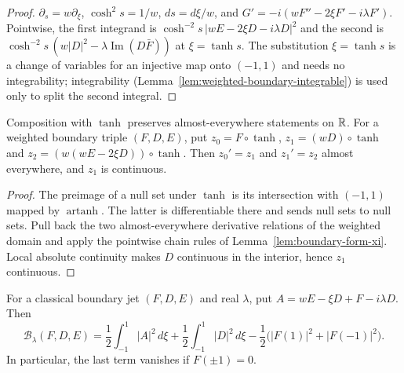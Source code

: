 \begin{proof}
\leanok
$\partial_s=w\partial_\xi$, $\cosh^2s=1/w$, $ds=d\xi/w$, and
$G'=-i(wF''-2\xi F'-i\lambda F')$. Pointwise, the first integrand is
$\cosh^{-2}s\,|wE-2\xi D-i\lambda D|^2$ and the second is
$\cosh^{-2}s\,(w|D|^2-\lambda\operatorname{Im}(D\bar F))$ at $\xi=\tanh s$. The
substitution $\xi=\tanh s$ is a change of variables for an injective map
onto $(-1,1)$ and needs no integrability; integrability
(Lemma~\ref{lem:weighted-boundary-integrable}) is used only to split the
second integral.
\end{proof}

\begin{lemma}
\label{lem:weighted-flow-derivatives}
\leanok
Composition with $\tanh$ preserves almost-everywhere statements on $\mathbb{R}$.
For a weighted boundary triple $(F,D,E)$, put
$z_0=F\circ\tanh$, $z_1=(wD)\circ\tanh$ and
$z_2=(w(wE-2\xi D))\circ\tanh$. Then $z_0'=z_1$ and $z_1'=z_2$ almost everywhere,
and $z_1$ is continuous.
\end{lemma}

\begin{proof}
\leanok
The preimage of a null set under $\tanh$ is its intersection with $(-1,1)$ mapped by
$\operatorname{artanh}$. The latter is differentiable there and sends null sets to null
sets. Pull back the two almost-everywhere derivative relations of the weighted domain
and apply the pointwise chain rules of Lemma~\ref{lem:boundary-form-xi}.
Local absolute continuity makes $D$ continuous in the interior, hence $z_1$ continuous.
\end{proof}

\begin{lemma}
\label{lem:trace-completion-classical}
\leanok
For a classical boundary jet $(F,D,E)$ and real $\lambda$, put
$A=wE-\xi D+F-i\lambda D$. Then
\[
  \mathcal B_\lambda(F,D,E)
  =\frac12\int_{-1}^1|A|^2\,d\xi
   +\frac12\int_{-1}^1|D|^2\,d\xi
   -\frac12\bigl(|F(1)|^2+|F(-1)|^2\bigr).
\]
In particular, the last term vanishes if $F(\pm1)=0$.
\end{lemma}


